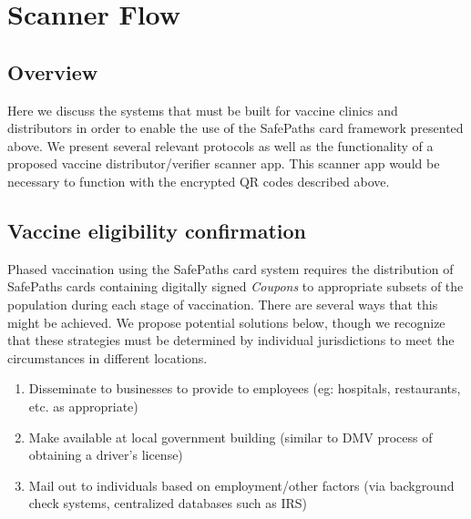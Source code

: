 \section{Scanner Flow}

\subsection{Overview}
Here we discuss the systems that must be built for vaccine clinics and distributors in order to enable the use of the SafePaths card framework presented above. We present several relevant protocols as well as the functionality of a proposed vaccine distributor/verifier scanner app. This scanner app would be necessary to function with the encrypted QR codes described above. 

\subsection{Vaccine eligibility confirmation}
Phased vaccination using the SafePaths card system requires the distribution of SafePaths cards containing digitally signed \textit{Coupons} to appropriate subsets of the population during each stage of vaccination. There are several ways that this might be achieved. We propose potential solutions below, though we recognize that these strategies must be determined by individual jurisdictions to meet the circumstances in different locations.  


\begin{enumerate}
    \item Disseminate to businesses to provide to employees (eg: hospitals, restaurants, etc. as appropriate)
    \item Make available at local government building (similar to DMV process of obtaining a driver’s license)
    \item Mail out to individuals based on employment/other factors (via background check systems, centralized databases such as IRS) 
\end{enumerate}



